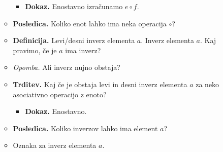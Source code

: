 \begin{enumerate}
\begin{itemize}
        \begin{itemize}
            \item \colorbox{green!30}{\textbf{Dokaz.}} Enostavno izračunamo $e \circ f$.
        \end{itemize}
        \item \colorbox{orange!30}{\textbf{Posledica.}} Koliko enot lahko ima neka operacija $\circ$?
        \item \colorbox{purple!30}{\textbf{Definicija.}} Levi/desni inverz elementa $a$. Inverz elementa $a$. Kaj pravimo, če je $a$ ima inverz?
        \item \colorbox{yellow!30}{\emph{Opomba.}} Ali inverz nujno obstaja?
        \item \colorbox{blue!30}{\textbf{Trditev.}} Kaj če je obstaja levi in desni inverz elementa $a$ za neko asociativno operacijo z enoto?
        \begin{itemize}
            \item \colorbox{green!30}{\textbf{Dokaz.}} Enostavno.
        \end{itemize}
        \item \colorbox{orange!30}{\textbf{Posledica.}} Koliko inverzov lahko ima element $a$?
        \item Oznaka za inverz elementa $a$.
    \end{itemize}


\end{enumerate}
